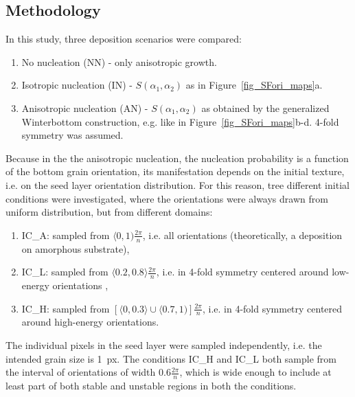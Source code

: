 \subsection{Methodology}
In this study, three deposition scenarios were compared:
\begin{enumerate}
	\item No nucleation (NN) - only anisotropic growth.
	\item Isotropic nucleation (IN) - $S(\alpha_1,\alpha_2)$ as in Figure~\ref{fig_SFori_maps}a.
	\item Anisotropic nucleation (AN) - $S(\alpha_1,\alpha_2)$ as obtained by the generalized Winterbottom construction, e.g. like in Figure~\ref{fig_SFori_maps}b-d. 4-fold symmetry was assumed.
\end{enumerate}
Because in the the anisotropic nucleation, the nucleation probability is a function of the bottom grain orientation, its manifestation depends on the initial texture, i.e. on the seed layer orientation distribution. For this reason, tree different initial conditions were investigated, where the orientations were always drawn from uniform distribution, but from different domains:
\begin{enumerate}
	\item IC\_A: sampled from $\langle 0,1)\frac{2\pi}{n}$, i.e. all orientations (theoretically, a deposition on amorphous substrate),
	\item IC\_L: sampled from $\langle 0.2,0.8\rangle \frac{2\pi}{n}$, i.e. in 4-fold symmetry centered around low-energy orientations ,
	\item IC\_H: sampled from $[\langle 0,0.3\rangle \cup \langle 0.7,1) ]\frac{2\pi}{n}$, i.e. in 4-fold symmetry centered around high-energy orientations.
\end{enumerate}
The individual pixels in the seed layer were sampled independently, i.e. the intended grain size is 1~px. The conditions IC\_H and IC\_L both sample from the interval of orientations of width $0.6\frac{2\pi}{n}$, which is wide enough to include at least part of both stable and unstable regions in both the conditions. 

